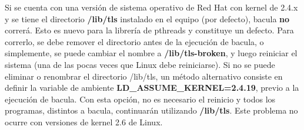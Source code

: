 Si se cuenta con una versión de sistema operativo de Red Hat con kernel de 2.4.x
y se tiene el directorio \textbf{/lib/tls} instalado en el equipo (por defecto),
bacula \textbf{no} correrá. Esto es nuevo para la librería de pthreads y constituye
un defecto. Para correrlo, se debe remover el directorio antes de la ejecución
de bacula, o simplemente, se puede cambiar el nombre a \textbf{/lib/tls-broken},
y luego reiniciar el sistema (una de las pocas veces que Linux debe reiniciarse).
Si no se puede eliminar o renombrar el directorio /lib/tls, un método alternativo
consiste en definir la variable de ambiente \textbf{LD\_ASSUME\_KERNEL=2.4.19},
previo a la ejecución de bacula. Con esta opción, no es necesario el reinicio
y todos los programas, distintos a bacula, continuarán utilizando \textbf{/lib/tls}.
Este problema no ocurre con versiones de kernel 2.6 de Linux. 

